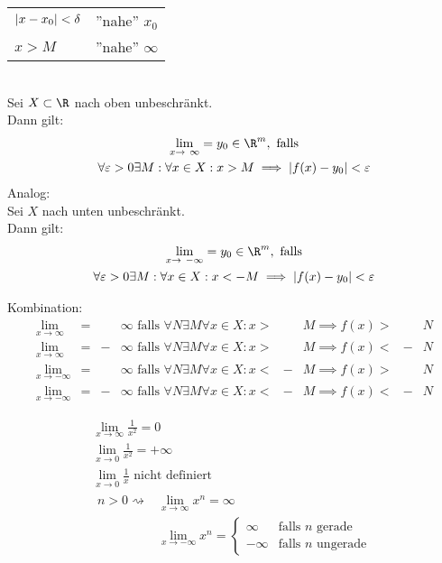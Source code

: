 \begin{def*}
	\begin{tabular}{ll}
		$\abs{x-x_0} < \delta$	&''nahe'' $x_0$	\\
		$x > M$				&''nahe'' $\infty$	
	\end{tabular}\\
	Sei $X \subset \R$ nach oben unbeschränkt. \\
	Dann gilt:
	\begin{gather*}
		\lim_{x \rightarrow \infty} = y_0 \in \R^m , \text{ falls} \\
		\forall \epsilon > 0 \exists M : \forall x \in X : x > M \implies \abs{f(x) - y_0} < \epsilon
	\end{gather*}
	Analog: \\
	Sei $X$ nach unten unbeschränkt. \\
	Dann gilt:
	\begin{gather*}
		\lim_{x \rightarrow -\infty} = y_0 \in \R^m , \text{ falls} \\
		\forall \epsilon > 0 \exists M : \forall x \in X : x < -M \implies \abs{f(x) - y_0} < \epsilon
	\end{gather*}
	
	Kombination:\\
	\begin{align*}
		\lim_{x \rightarrow \infty}	&=	&	&\infty \text{ falls } \forall N \exists M \forall x \in X : x >	&	&M \implies f(x) >	&	&N \\
		\lim_{x \rightarrow \infty}	&=	&- 	&\infty \text{ falls } \forall N \exists M \forall x \in X : x >	&	&M \implies f(x) <	&-	&N \\
		\lim_{x \rightarrow -\infty}	&=	&	&\infty \text{ falls } \forall N \exists M \forall x \in X : x <	&-	&M \implies f(x) >	&	&N \\
		\lim_{x \rightarrow -\infty}	&=	&-	&\infty \text{ falls } \forall N \exists M \forall x \in X : x <	&-	&M \implies f(x) <	&-	&N 
	\end{align*}
\end{def*}
\begin{bsp*}
	\begin{gather*}
		\lim_{x \rightarrow \infty} \frac{1}{x^2} = 0 \\
		\lim_{x \rightarrow 0} \frac{1}{x^2} = +\infty \\
		\lim_{x \rightarrow 0} \frac{1}{x} \text{ nicht definiert} \\
		\begin{split}
			n > 0 \rightsquigarrow	&\lim_{x \rightarrow \infty} x^n = \infty \\
								&\lim_{x \rightarrow -\infty} x^n = \begin{cases}
									\infty	&\text{falls } n \text{ gerade}	\\
									-\infty	&\text{falls } n \text{ ungerade}	
								\end{cases}
		\end{split}
	\end{gather*}
\end{bsp*}

